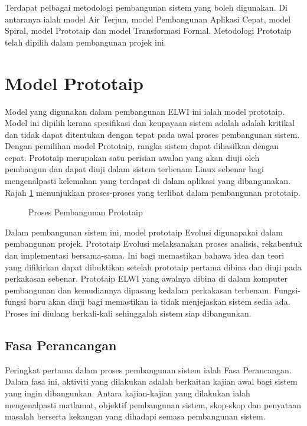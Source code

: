 Terdapat pelbagai metodologi pembangunan sistem yang boleh digunakan. Di antaranya ialah model Air Terjun, model Pembangunan Aplikasi Cepat, model Spiral, model Prototaip dan model Transformasi Formal. Metodologi Prototaip telah dipilih dalam pembangunan projek ini.

\section{Model Prototaip}
Model yang digunakan dalam pembangunan ELWI ini ialah model prototaip. Model ini dipilih kerana spesifikasi dan keupayaan sistem adalah adalah kritikal dan tidak dapat ditentukan dengan tepat pada awal proses pembangunan sistem. Dengan pemilihan model Prototaip, rangka sistem dapat dihasilkan dengan cepat. Prototaip merupakan satu perisian awalan yang akan diuji oleh pembangun dan dapat diuji dalam sistem terbenam Linux sebenar bagi mengenalpasti kelemahan yang terdapat di dalam aplikasi yang dibangunakan. Rajah \ref{c3:f1} menunjukkan proses-proses yang terlibat dalam pembangunan prototaip.

\begin{figure}[!h]
\caption[Proses Pembangunan Prototaip]{Proses Pembangunan Prototaip}
\label{c3:f1}
\end{figure}

Dalam pembangunan sistem ini, model prototaip Evolusi digunapakai dalam pembangunan projek. Prototaip Evolusi melaksanakan proses analisis, rekabentuk dan implementasi bersama-sama. Ini bagi memastikan bahawa idea dan teori yang difikirkan dapat dibuktikan setelah prototaip pertama dibina dan diuji pada perkakasan sebenar. Prototaip ELWI yang awalnya dibina di dalam komputer pembangunan dan kemudiannya dipasang kedalam perkakasan terbenam. Fungsi-fungsi baru akan diuji bagi memastikan ia tidak menjejaskan sistem sedia ada. Proses ini diulang berkali-kali sehinggalah sistem siap dibangunkan.

\subsection{Fasa Perancangan}
Peringkat pertama dalam proses pembangunan sistem ialah Fasa Perancangan. Dalam fasa ini, aktiviti yang dilakukan adalah berkaitan kajian awal bagi sistem yang ingin dibangunkan. Antara kajian-kajian yang dilakukan ialah mengenalpasti matlamat, objektif pembangunan sistem, skop-skop dan penyataan masalah berserta kekangan yang dihadapi semasa pembangunan sistem. 

